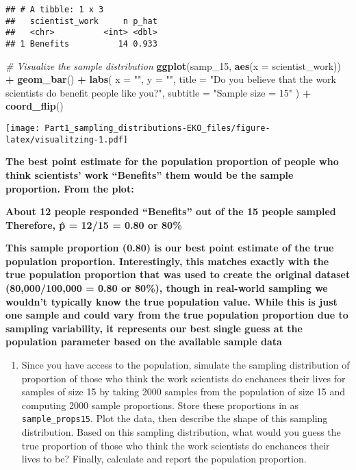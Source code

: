 \documentclass[
]{article}
\newenvironment{Shaded}{\begin{snugshade}}{\end{snugshade}}
\newcommand{\AttributeTok}[1]{\textcolor[rgb]{0.13,0.29,0.53}{#1}}
\newcommand{\CommentTok}[1]{\textcolor[rgb]{0.56,0.35,0.01}{\textit{#1}}}
\newcommand{\FunctionTok}[1]{\textcolor[rgb]{0.13,0.29,0.53}{\textbf{#1}}}
\newcommand{\NormalTok}[1]{#1}
\newcommand{\SpecialCharTok}[1]{\textcolor[rgb]{0.81,0.36,0.00}{\textbf{#1}}}
\newcommand{\StringTok}[1]{\textcolor[rgb]{0.31,0.60,0.02}{#1}}
\providecommand{\tightlist}{%
  \setlength{\itemsep}{0pt}\setlength{\parskip}{0pt}}
\begin{document}
\begin{verbatim}
## # A tibble: 1 x 3
##   scientist_work     n p_hat
##   <chr>          <int> <dbl>
## 1 Benefits          14 0.933
\end{verbatim}

\begin{Shaded}
\begin{Highlighting}[]
\CommentTok{\# Visualize the sample distribution}
\FunctionTok{ggplot}\NormalTok{(samp\_15, }\FunctionTok{aes}\NormalTok{(}\AttributeTok{x =}\NormalTok{ scientist\_work)) }\SpecialCharTok{+}
  \FunctionTok{geom\_bar}\NormalTok{() }\SpecialCharTok{+}
  \FunctionTok{labs}\NormalTok{(}
    \AttributeTok{x =} \StringTok{""}\NormalTok{, }\AttributeTok{y =} \StringTok{""}\NormalTok{,}
    \AttributeTok{title =} \StringTok{"Do you believe that the work scientists do benefit people like you?"}\NormalTok{,}
    \AttributeTok{subtitle =} \StringTok{"Sample size = 15"}
\NormalTok{  ) }\SpecialCharTok{+}
  \FunctionTok{coord\_flip}\NormalTok{()}
\end{Highlighting}
\end{Shaded}

\texttt{[image: Part1\_sampling\_distributions-EKO\_files/figure-latex/visualitzing-1.pdf]}

\textbf{The best point estimate for the population proportion of people
who think scientists' work ``Benefits'' them would be the sample
proportion. From the plot:}

\textbf{About 12 people responded ``Benefits'' out of the 15 people
sampled Therefore, p̂ = 12/15 = 0.80 or 80\%}

\textbf{This sample proportion (0.80) is our best point estimate of the
true population proportion. Interestingly, this matches exactly with the
true population proportion that was used to create the original dataset
(80,000/100,000 = 0.80 or 80\%), though in real-world sampling we
wouldn't typically know the true population value. While this is just
one sample and could vary from the true population proportion due to
sampling variability, it represents our best single guess at the
population parameter based on the available sample data}

\begin{enumerate}
\def\labelenumi{\arabic{enumi}.}
\setcounter{enumi}{7}
\tightlist
\item
  Since you have access to the population, simulate the sampling
  distribution of proportion of those who think the work scientists do
  enchances their lives for samples of size 15 by taking 2000 samples
  from the population of size 15 and computing 2000 sample proportions.
  Store these proportions in as \texttt{sample\_props15}. Plot the data,
  then describe the shape of this sampling distribution. Based on this
  sampling distribution, what would you guess the true proportion of
  those who think the work scientists do enchances their lives to be?
  Finally, calculate and report the population proportion.
\end{enumerate}
\end{document}
